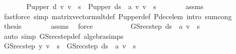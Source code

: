 \begin{isabellebody}
\ \ \ \ \isamarkupfalse%
\ \isamarkupfalse%
\ {\isachardoublequoteopen}{\isacharparenleft}{\kern0pt}P{\isacharunderscore}{\kern0pt}upper\ d\ {\isacharasterisk}{\kern0pt}v\ v{\isacharparenright}{\kern0pt}\ {\isachardollar}{\kern0pt}\ s{\isacharprime}{\kern0pt}\ {\isacharequal}{\kern0pt}\ {\isacharparenleft}{\kern0pt}P{\isacharunderscore}{\kern0pt}upper\ {\isacharparenleft}{\kern0pt}d{\isacharparenleft}{\kern0pt}s\ {\isacharcolon}{\kern0pt}{\isacharequal}{\kern0pt}\ a{\isacharparenright}{\kern0pt}{\isacharparenright}{\kern0pt}\ {\isacharasterisk}{\kern0pt}v\ v{\isacharparenright}{\kern0pt}\ {\isachardollar}{\kern0pt}\ s{\isacharprime}{\kern0pt}{\isachardoublequoteclose}\isanewline
\ \ \ \ \ \ \isamarkupfalse%
\ assms\isanewline
\ \ \ \ \ \ \isamarkupfalse%
\ {\isacharparenleft}{\kern0pt}fastforce\ simp{\isacharcolon}{\kern0pt}\ matrix{\isacharunderscore}{\kern0pt}vector{\isacharunderscore}{\kern0pt}mult{\isacharunderscore}{\kern0pt}def\ P{\isacharunderscore}{\kern0pt}upper{\isacharunderscore}{\kern0pt}def\ P{\isacharunderscore}{\kern0pt}dec{\isacharunderscore}{\kern0pt}elem\ intro{\isacharbang}{\kern0pt}{\isacharcolon}{\kern0pt}\ sum{\isachardot}{\kern0pt}cong{\isacharparenright}{\kern0pt}\isanewline
\ \ \ \ \isamarkupfalse%
\ \isamarkupfalse%
\ {\isacharquery}{\kern0pt}thesis\isanewline
\ \ \ \ \ \ \isamarkupfalse%
\ assms{\isacharparenleft}{\kern0pt}{}{\isacharparenright}{\kern0pt}\ \isamarkupfalse%
\ force\isanewline
\ \ \isamarkupfalse%
\isanewline
\ \ \isamarkupfalse%
\ \isamarkupfalse%
\ {\isachardoublequoteopen}{\isasymdots}\ {\isacharequal}{\kern0pt}\ GS{\isacharunderscore}{\kern0pt}rec{\isacharunderscore}{\kern0pt}step\ {\isacharparenleft}{\kern0pt}d{\isacharparenleft}{\kern0pt}s\ {\isacharcolon}{\kern0pt}{\isacharequal}{\kern0pt}\ a{\isacharparenright}{\kern0pt}{\isacharparenright}{\kern0pt}\ v\ {\isachardollar}{\kern0pt}\ s{\isacharprime}{\kern0pt}{\isachardoublequoteclose}\isanewline
\ \ \ \ \isamarkupfalse%
\ {\isacharparenleft}{\kern0pt}auto\ simp{\isacharcolon}{\kern0pt}\ GS{\isacharunderscore}{\kern0pt}rec{\isacharunderscore}{\kern0pt}step{\isacharunderscore}{\kern0pt}def\ algebra{\isacharunderscore}{\kern0pt}simps{\isacharparenright}{\kern0pt}\isanewline
\ \ \isamarkupfalse%
\ \isamarkupfalse%
\ {\isachardoublequoteopen}GS{\isacharunderscore}{\kern0pt}rec{\isacharunderscore}{\kern0pt}step\ y\ v\ {\isachardollar}{\kern0pt}\ s{\isacharprime}{\kern0pt}\ {\isasymle}\ GS{\isacharunderscore}{\kern0pt}rec{\isacharunderscore}{\kern0pt}step\ {\isacharparenleft}{\kern0pt}d{\isacharparenleft}{\kern0pt}s\ {\isacharcolon}{\kern0pt}{\isacharequal}{\kern0pt}\ a{\isacharparenright}{\kern0pt}{\isacharparenright}{\kern0pt}\ v\ {\isachardollar}{\kern0pt}\ s{\isacharprime}{\kern0pt}{\isachardoublequoteclose}\isacommand{{\isachardot}{\kern0pt}}\isamarkupfalse%

\end{isabellebody}
